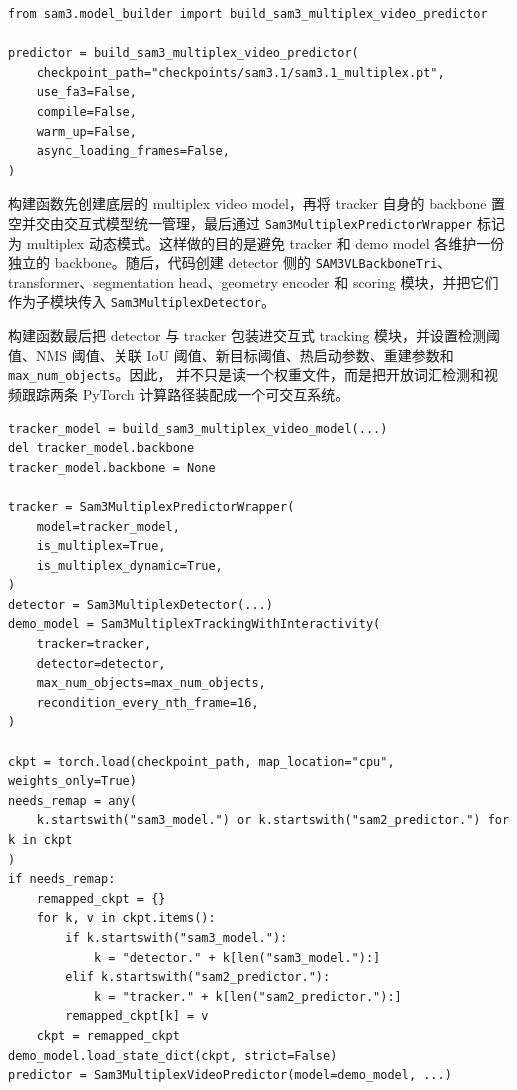 \documentclass[UTF8,a4paper,zihao=-4,fontset=none]{ctexart}
\newcommand{\codepath}[1]{\path{#1}}
\begin{document}
\begin{lstlisting}[style=pythoncode,caption={SAM 3.1 multiplex predictor 构建示例}]
from sam3.model_builder import build_sam3_multiplex_video_predictor

predictor = build_sam3_multiplex_video_predictor(
    checkpoint_path="checkpoints/sam3.1/sam3.1_multiplex.pt",
    use_fa3=False,
    compile=False,
    warm_up=False,
    async_loading_frames=False,
)
\end{lstlisting}

构建函数先创建底层的 multiplex video model，再将 tracker 自身的 backbone 置空并交由交互式模型统一管理，最后通过 \texttt{Sam3MultiplexPredictorWrapper} 标记为 multiplex 动态模式。这样做的目的是避免 tracker 和 demo model 各维护一份独立的 backbone。随后，代码创建 detector 侧的 \texttt{SAM3VLBackboneTri}、transformer、segmentation head、geometry encoder 和 scoring 模块，并把它们作为子模块传入 \texttt{Sam3MultiplexDetector}。

构建函数最后把 detector 与 tracker 包装进交互式 tracking 模块，并设置检测阈值、NMS 阈值、关联 IoU 阈值、新目标阈值、热启动参数、重建参数和 \texttt{max\_num\_objects}。因此，\codepath{build_sam3_multiplex_video_predictor} 并不只是读一个权重文件，而是把开放词汇检测和视频跟踪两条 PyTorch 计算路径装配成一个可交互系统。

\begin{lstlisting}[style=pythoncode,caption={模型构建与 checkpoint 键名映射的源码逻辑摘录}]
tracker_model = build_sam3_multiplex_video_model(...)
del tracker_model.backbone
tracker_model.backbone = None

tracker = Sam3MultiplexPredictorWrapper(
    model=tracker_model,
    is_multiplex=True,
    is_multiplex_dynamic=True,
)
detector = Sam3MultiplexDetector(...)
demo_model = Sam3MultiplexTrackingWithInteractivity(
    tracker=tracker,
    detector=detector,
    max_num_objects=max_num_objects,
    recondition_every_nth_frame=16,
)

ckpt = torch.load(checkpoint_path, map_location="cpu", weights_only=True)
needs_remap = any(
    k.startswith("sam3_model.") or k.startswith("sam2_predictor.") for k in ckpt
)
if needs_remap:
    remapped_ckpt = {}
    for k, v in ckpt.items():
        if k.startswith("sam3_model."):
            k = "detector." + k[len("sam3_model."):]
        elif k.startswith("sam2_predictor."):
            k = "tracker." + k[len("sam2_predictor."):]
        remapped_ckpt[k] = v
    ckpt = remapped_ckpt
demo_model.load_state_dict(ckpt, strict=False)
predictor = Sam3MultiplexVideoPredictor(model=demo_model, ...)
\end{lstlisting}
\end{document}
